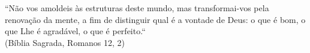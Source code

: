 \begin{epigrafe}
    \vspace*{\fill}
    
    \begin{flushright}
        \begin{minipage}{8cm}
            \begin{SingleSpace}
                ``Não vos amoldeis às estruturas deste mundo,
                mas transformai-vos pela renovação da mente,
                a fim de distinguir qual é a vontade de Deus:
                o que é bom, o que Lhe é agradável, o que é perfeito.``\\
                (Bíblia Sagrada, Romanos 12, 2)
            \end{SingleSpace}
        \end{minipage}
    \end{flushright}
\end{epigrafe}